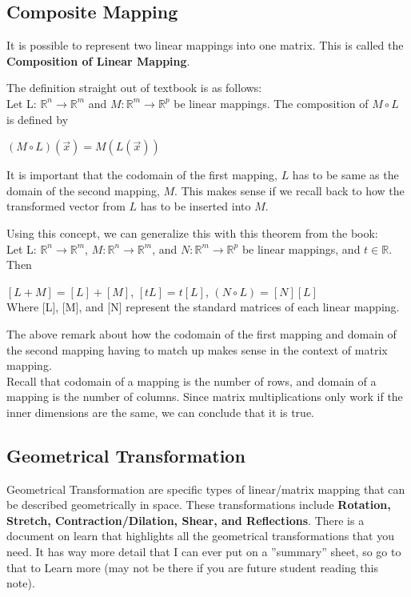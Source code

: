 \documentclass[12pt]{article}
\newcommand{\R}{\mathbb{R}}
\begin{document}
\subsection{Composite Mapping}
It is possible to represent two linear mappings into one matrix. This is called the \textbf{Composition of Linear Mapping}.

The definition straight out of textbook is as follows:\\
Let L: $\R^n \rightarrow \R^m$ and $M: \R^m \rightarrow \R^p$ be linear mappings. The composition of $M \circ L$ is defined by \\
\begin{center}
$(M \circ L)(\vec{x}) = M(L(\vec{x}))$
\end{center} 
\cite{textbook}
It is important that the codomain of the first mapping, $L$ has to be same as the domain of the second mapping, $M$. This makes sense if we recall back to how the transformed vector from $L$ has to be inserted into $M$.


Using this concept, we can generalize this with this theorem from the book:\\
Let L: $\R^n \rightarrow \R^m$, $M: \R^n \rightarrow \R^m$, and $N: \R^m \rightarrow \R^p$  be linear mappings, and $t \in \R$. Then\\
\begin{center}
$[L+M] = [L] + [M]$, $[tL] = t[L]$, $(N \circ L) = [N][L]$\\
Where [L], [M], and [N] represent the standard matrices of each linear mapping.
\end{center} 
\cite{textbook}
The above remark about how the codomain of the first mapping and domain of the second mapping having to match up makes sense in the context of matrix mapping.\\
Recall that codomain of a mapping is the number of rows, and domain of a mapping is the number of columns. Since matrix multiplications only work if the inner dimensions are the same, we can conclude that it is true.\\


\subsection{Geometrical Transformation}
Geometrical Transformation are specific types of linear/matrix mapping that can be described geometrically in space. These transformations include \textbf{Rotation, Stretch, Contraction/Dilation, Shear, and Reflections}. There is a document on learn that highlights all the geometrical transformations that you need. It has way more detail that I can ever put on a ''summary'' sheet, so go to that to Learn more (may not be there if you are future student reading this note).
\end{document}

